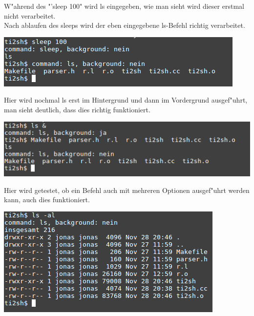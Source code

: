 \documentclass{ti2}
\begin{document}
W"ahrend des "'sleep 100" wird ls eingegeben, wie man sieht wird dieser erstmal nicht verarbeitet.\\
Nach ablaufen des sleeps wird der eben eingegebene ls-Befehl richtig verarbeitet.\\
\begin{minipage}{\linewidth}
	\centering%
	\includegraphics[width=\textwidth]{aufgabe01/test2.png}
\end{minipage}

Hier wird nochmal ls erst im Hintergrund und dann im Vordergrund ausgef"uhrt, man sieht deutlich, dass dies richtig funktioniert.\\

\begin{minipage}{\linewidth}
	\centering%
	\includegraphics[width=\textwidth]{aufgabe01/test3.png}
\end{minipage}

Hier wird getestet, ob ein Befehl auch mit mehreren Optionen ausgef"uhrt werden kann, auch dies funktioniert.\\

\begin{minipage}{\linewidth}
	\centering%
	\includegraphics[width=\textwidth]{aufgabe01/test4.png}
\end{minipage}
\end{document}
